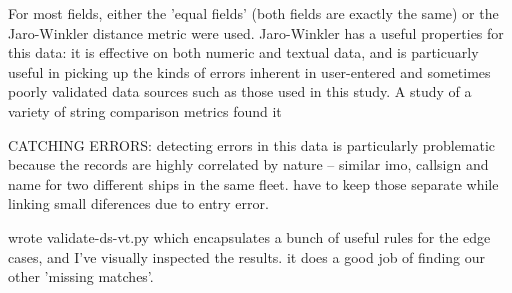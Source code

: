For most fields, either the 'equal fields' (both fields are exactly the same) or the Jaro-Winkler distance metric were used. Jaro-Winkler has a useful properties for this data: it is effective on both numeric and textual data, and is particuarly useful in picking up the kinds of errors inherent in user-entered and sometimes poorly validated data sources such as those used in this study. A study of a variety of string comparison metrics \cite{Cohen2003} found it %

CATCHING ERRORS:
 detecting errors in this data is particularly problematic because the records are highly correlated by nature -- similar imo, callsign and name for two different ships in the same fleet. have to keep those separate while linking small diferences due to entry error.

 wrote validate-ds-vt.py which encapsulates a bunch of useful rules for the edge cases, and I've visually inspected the results. it does a good job of finding our other 'missing matches'.

